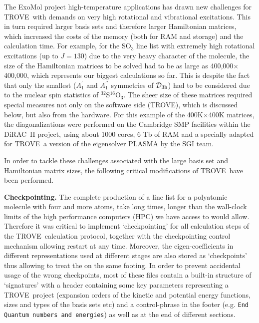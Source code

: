 \documentclass[12pt]{article}
\newcommand{\trove}{{\sc TROVE}}
\newcommand{\p}{^\prime}
\newcommand{\pp}{^{\prime\prime}}
\newcommand{\Dh}[1]{${\mathcal D}_{#1{\rm h}}$}
\newcommand{\2}{$_{2}$}
\newcommand{\3}{$_{3}$}
\newcommand{\4}{$_{4}$}
\begin{document}
The ExoMol project high-temperature applications has drawn new
challenges for \trove\ with demands on very high rotational and
vibrational excitations. This in turn required larger basis sets and
therefore larger Hamiltonian matrices, which increased the costs of
the memory (both for RAM and storage) and the calculation time. For
example, for the SO$_3$ line list \cite{jtSO3} with extremely high
rotational excitations (up to $J=130$) due to the very heavy character
of the molecule, the size of the Hamiltonian matrices to be solved had
to be as large as 400,000$\times$400,000, which represents our biggest
calculations so far. This is despite the fact that only the smallest
($A_1\p$ and $A_1\pp$ symmetries of \Dh{3}) had to be considered due
to the nuclear spin statistics of $^{32}$S$^{16}$O$_3$. The sheer size
of these matrices required special measures not only on the software
side (\trove), which is discussed below, but also from the hardware.
For this example of the 400K$\times$400K matrices, the
diagonalizations were performed on the Cambridge SMP facilities within
the DiRAC~II project, using about 1000 cores, 6 Tb of RAM and a
specially adapted for \trove\ a version of the eigensolver PLASMA by
the SGI team.

In order to tackle these challenges associated with the large basis set and Hamiltonian matrix sizes, the following critical modifications of \trove\ have been performed.

\textbf{Checkpointing.} The complete production of a line list for a
polyatomic molecule with four and more atoms, take long times, longer
than the wall-clock limits of the high performance computers (HPC)
we have access to would allow. Therefore it was
critical to implement `checkpointing' for all calculation steps of the
\trove\ calculation protocol, together with the checkpointing control
mechanism allowing restart at any time. Moreover, the
eigen-coefficients in different representations used at different
stages are also stored as `checkpoints' thus allowing to treat the on
the same footing. In order to prevent accidental usage of the wrong
checkpoints, most of these files contain a built-in structure of
`signatures' with a header containing some key parameters representing
a \trove\ project (expansion orders of the kinetic and potential
energy functions, sizes and types of the basis sets etc) and a
control-phrase in the footer (e.g.
\verb!End Quantum numbers and energies!) as well as at the end of
different sections.
\end{document}
